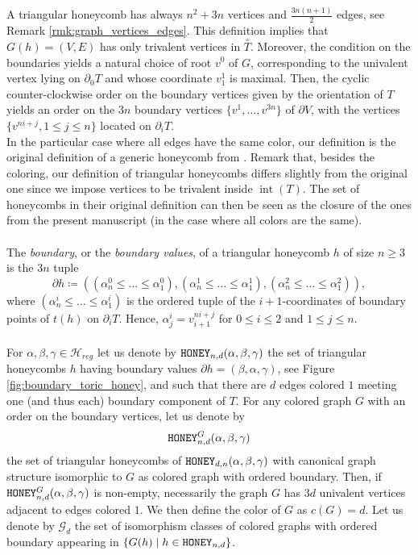 \documentclass[11pt,a4paper]{amsart}
\providecommand{\honey}{\texttt{\textsc{HONEY}}}
\DeclareMathOperator{\interior}{int}
\numberwithin{equation}{section}
\theoremstyle{definition}
\begin{document}
\noindent
A triangular honeycomb 
has always $n^2+3n$ vertices and $\frac{3n(n+1)}{2}$ edges, 
see Remark \ref{rmk:graph_vertices_edges}.
This definition implies that $G(h)=(V,E)$ has only trivalent 
vertices in $\overset{\circ} T$. Moreover, the condition on 
the boundaries yields a natural choice of root 
$v^0$ of $G$, corresponding to the univalent vertex lying on 
$\partial_0T$ and whose coordinate $v^1_1$ is maximal. 
Then, the cyclic counter-clockwise order on the boundary vertices 
given by the orientation of $T$ yields an order on the $3n$ boundary vertices 
$\{v^1,\ldots,v^{3n}\}$ of $\partial V$, with the vertices $\{v^{ni+j},1\leqslant j\leqslant n\}$ located on $\partial_iT$.
\\
In the particular case where all edges have the same color, 
our definition is the original definition of a generic honeycomb 
from \autocite{Knutson_Tao_honeycomb}. Remark that, besides the coloring, 
our definition of triangular honeycombs differs slightly from the original 
one since we impose vertices to be trivalent inside $\interior(T)$. 
The set of honeycombs in their original definition can then be seen as the closure 
of the ones from the present manuscript (in the case where all colors are the same).
\\
\\
The \textit{boundary}, or the \textit{boundary values}, 
of a triangular honeycomb $h$ of size $n \geqslant 3$ 
is the $3n$ tuple 
\begin{equation}
    \label{eq:boundary_honeycomb_order}
    \partial h \coloneqq 
    \left((\alpha^0_n \leqslant \dots\leqslant  \alpha^0_1), 
    (\alpha^1_n\leqslant \dots\leqslant \alpha^1_1), 
    ( \alpha^2_n\leqslant \dots\leqslant \alpha^2_1)\right),
\end{equation}
where $(\alpha^i_n\leqslant \dots\leqslant \alpha^i_1)$ is the ordered 
tuple of the $i+1$-coordinates of boundary points of 
$t(h)$ on $\partial_iT$. Hence, 
$\alpha^i_j=v^{ni+j}_{i+1}$ for $0\leqslant i\leqslant 2$ and $1\leqslant j\leqslant n$.
\\
\\
For $\alpha,\beta,\gamma\in \mathcal{H}_{reg}$ let us 
denote by $\honey_{n, d}(\alpha, \beta, \gamma)$ 
the set of triangular honeycombs $h$ having boundary 
values $ \partial h = (\beta, \alpha, \gamma)$, 
see Figure \ref{fig:boundary_toric_honey}, and such that 
there are $d$ edges colored $1$ meeting one (and thus each) 
boundary component of $T$. 
For any colored graph $G$ with an order on the boundary vertices, let us denote by 
\begin{equation*}
    \honey_{n,d}^G({\alpha,\beta,\gamma})
\end{equation*}
the set of triangular honeycombs of $\honey_{d, n}(\alpha, \beta, \gamma)$ with canonical graph 
structure isomorphic to $G$ as colored graph with ordered boundary. Then, if $\honey_{n,d}^G({\alpha,\beta,\gamma})$ is non-empty,  necessarily the graph $G$ has $3d$ univalent vertices adjacent to edges colored $1$. We then define the color of $G$ as $c(G)=d$.
Let us denote by $\mathcal{G}_d$ the set of isomorphism classes of colored 
graphs with ordered boundary appearing in $\{G(h) \mid h\in\honey_{n,d}\}$.
\end{document}
